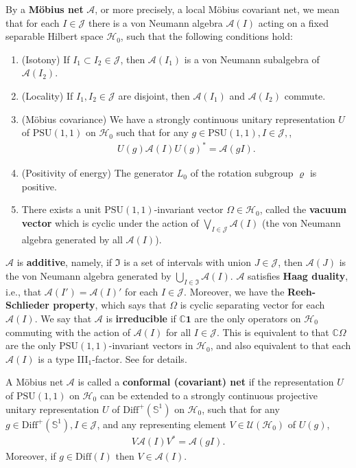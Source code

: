 \documentclass[12pt,a4paper,notitlepage]{article}
\theoremstyle{definition}
\theoremstyle{plain}
\newcommand{\fk}{\mathfrak}
\newcommand{\mc}{\mathcal}
\newcommand{\id}{\mathbf{1}}
\newcommand{\Diffp}{\mathrm{Diff}^+}
\newcommand{\Diff}{\mathrm{Diff}}
\newcommand{\PSU}{\mathrm{PSU}(1,1)}
\newcommand{\mbb}{\mathbb}
\newcommand{\Cbb}{\mathbb C}
\numberwithin{equation}{section}
\begin{document}
By a  \textbf{M\"obius net} $\mc A$, or more precisely, a local M\"obius covariant net, we mean that for each $I\in\mathcal J$ there is a von Neumann algebra $\mathcal A(I)$ acting on a fixed separable Hilbert space $\mathcal H_0$, such that the following conditions hold:
\begin{enumerate}[label=(\alph*)]
\item (Isotony) If $I_1\subset I_2\in\mathcal J$, then $\mathcal A(I_1)$ is a von Neumann subalgebra of $\mathcal A(I_2)$.
\item (Locality) If $I_1,I_2\in\mathcal J$ are disjoint, then $\mathcal A(I_1)$ and $\mathcal A(I_2)$ commute.
\item (M\"obius covariance) We have a strongly continuous  unitary representation $U$ of $\PSU$ on $\mc H_0$ such that for any $g\in\PSU, I\in\mc J,$, 
\begin{align*}
	U(g)\mc A(I)U(g)^*=\mc A(gI).
\end{align*}
\item (Positivity of energy) The generator $L_0$ of the rotation subgroup $\varrho$  is positive.
\item There exists a unit $\PSU$-invariant vector $\Omega\in\mc H_0$, called the \textbf{vacuum vector} which is  cyclic under the action of $\bigvee_{I\in\mathcal J}\mathcal A(I)$ (the von Neumann algebra generated by all $\mathcal A(I)$).
\end{enumerate}

$\mc A$ is \textbf{additive}, namely, if $\fk I$ is a set of intervals with union $J\in\mc J$, then $\mc A(J)$ is the von Neumann algebra generated by $\bigcup_{I\in\fk I}\mc A(I)$. $\mc A$ satisfies \textbf{Haag duality}, i.e., that $\mc A(I')=\mc A(I)'$ for each $I\in \mc J$. Moreover, we have the \textbf{Reeh-Schlieder property}, which says that $\Omega$ is  cyclic separating vector for each $\mc A(I)$. We say that $\mc A$ is \textbf{irreducible} if $\Cbb \id$ are the only operators on $\mc H_0$ commuting with the action of $\mc A(I)$ for all $I\in\mc J$. This is equivalent to that $\Cbb\Omega$ are the only $\PSU$-invariant vectors in $\mc H_0$, and also equivalent to that each $\mc A(I)$ is a type III$_1$-factor.  See \cite[Sec. 1]{GL96} for details.



A M\"obius net $\mc A$ is called a \textbf{conformal (covariant) net} if the representation $U$ of $\PSU$ on $\mc H_0$ can be extended to a strongly continuous projective unitary representation $U$ of $\Diffp(\mbb S^1)$ on $\mathcal H_0$, such that for any $g\in \Diffp(\mbb S^1),I\in\mathcal J$, and any representing element $V\in\mathcal U(\mathcal H_0)$ of $U(g)$,
\begin{align*}
	V\mathcal A(I)V^*=\mathcal A(gI).
\end{align*}
Moreover, if $g\in\Diff(I)$ then $V\in\mc A(I)$.
\end{document}
